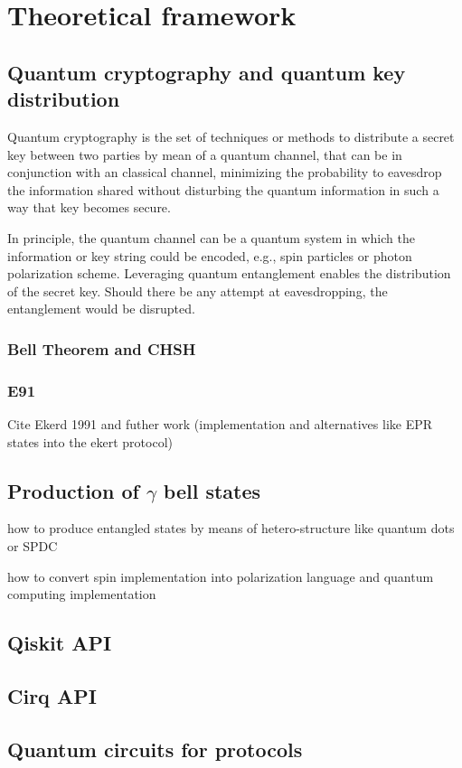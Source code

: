 \section{Theoretical framework}

\subsection{Quantum cryptography and quantum key distribution}



Quantum cryptography is the set of techniques or methods to distribute a secret key  between two parties by mean of a quantum channel, that can be in conjunction with an classical channel, minimizing the probability to eavesdrop the information shared without  disturbing the quantum information in such a way that key becomes secure. \cite{bennett2014quantum}

In principle, the quantum channel can be a quantum system in which the information or key string could be encoded, e.g., spin particles or photon polarization scheme. Leveraging quantum entanglement enables the distribution of the secret key. Should there be any attempt at eavesdropping, the entanglement would be disrupted.


\subsubsection{Bell Theorem and CHSH}

\subsubsection{E91}

Cite Ekerd 1991 \cite{ekert1991quantum} and futher work (implementation and alternatives like EPR states into the ekert protocol)

\subsection{Production of $\gamma$ bell states}

how to produce entangled states by means of hetero-structure like quantum dots or SPDC

how to convert spin implementation into polarization language and quantum computing implementation

\subsection{Qiskit API}

\subsection{Cirq API}

\subsection{Quantum circuits for protocols}